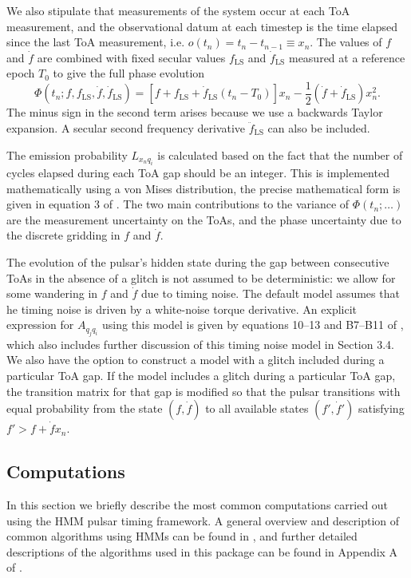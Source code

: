 \documentclass{article}
\begin{document}
We also stipulate that measurements of the system occur at each ToA measurement, and the observational datum at each timestep is the time elapsed since the last ToA measurement, i.e. $o(t_n) = t_n - t_{n-1} \equiv x_n$.
The values of $f$ and $\dot{f}$ are combined with fixed secular values $f_\text{LS}$ and $\dot{f}_\text{LS}$ measured at a reference epoch $T_0$ to give the full phase evolution \begin{equation} \Phi(t_n; f, f_\text{LS}, \dot{f}, \dot{f}_\text{LS}) = \left[f + f_\text{LS} + \dot{f}_\text{LS}(t_n-T_0)\right]x_n - \frac{1}{2}\left(\dot{f} + \dot{f}_\text{LS}\right)x_n^2. \end{equation}
The minus sign in the second term arises because we use a backwards Taylor expansion.
A secular second frequency derivative $\ddot{f}_\text{LS}$ can also be included.

The emission probability $L_{x_n q_i}$ is calculated based on the fact that the number of cycles elapsed during each ToA gap should be an integer.
This is implemented mathematically using a von Mises distribution, the precise mathematical form is given in equation 3 of \citet{DunnMelatos2022}.
The two main contributions to the variance of $\Phi(t_n; \ldots)$ are the measurement uncertainty on the ToAs, and the phase uncertainty due to the discrete gridding in $f$ and $\dot{f}$.

The evolution of the pulsar's hidden state during the gap between consecutive ToAs in the absence of a glitch is not assumed to be deterministic: we allow for some wandering in $f$ and $\dot{f}$ due to timing noise.
The default model assumes that he timing noise is driven by a white-noise torque derivative.
An explicit expression for $A_{q_j q_i}$ using this model is given by equations 10--13 and B7--B11 of \citet{MelatosDunn2020}, which also includes further discussion of this timing noise model in Section 3.4.
We also have the option to construct a model with a glitch included during a particular ToA gap.
If the model includes a glitch during a particular ToA gap, the transition matrix for that gap is modified so that the pulsar transitions with equal probability from the state $(f, \dot{f})$ to all available states $(f', \dot{f}')$ satisfying $f' > f + \dot{f}x_n$.

\subsection{Computations}
In this section we briefly describe the most common computations carried out using the HMM pulsar timing framework.
A general overview and description of common algorithms using HMMs can be found in \citet{Rabiner1989}, and further detailed descriptions of the algorithms used in this package can be found in Appendix A of \citet{MelatosDunn2020}.
\end{document}
